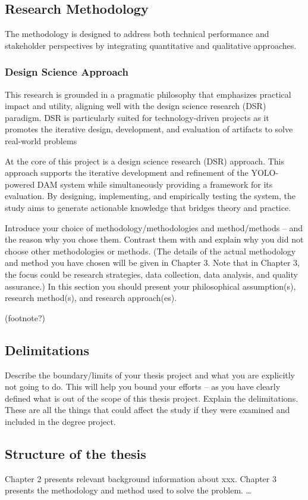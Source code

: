 \documentclass[a4paper,12pt,twocolumn]{article}
\numberwithin{figure}{section}
\numberwithin{table}{section}
\begin{document}
\subsection{Research Methodology}
The methodology is designed to address both technical 
performance and stakeholder perspectives by integrating 
quantitative and qualitative approaches.

\subsubsection{Design Science Approach}
This research is grounded in a pragmatic philosophy that 
emphasizes practical impact and utility, aligning well with 
the design science research (DSR) paradigm. DSR is particularly suited for technology-driven projects as it promotes the iterative design, development, and evaluation of artifacts to solve real-world problems

At the core of this project is a design science research (DSR) approach.
 This approach supports the iterative development and refinement of the
 YOLO-powered DAM system while simultaneously providing a framework 
 for its evaluation. By designing, implementing, and empirically testing 
 the system, the study aims to generate actionable knowledge that 
 bridges theory and practice.



Introduce your choice of methodology/methodologies and method/methods – and the reason why
you chose them. Contrast them with and explain why you did not choose other methodologies or
methods. (The details of the actual methodology and method you have chosen will be given in
Chapter 3. Note that in Chapter 3, the focus could be research strategies, data collection, data
analysis, and quality assurance.)
In this section you should present your philosophical assumption(s), research method(s), and
research approach(es).

(footnote?)
\subsection{Delimitations}
Describe the boundary/limits of your thesis project and what you are explicitly not going to do. This
will help you bound your efforts – as you have clearly defined what is out of the scope of this
thesis project. Explain the delimitations. These are all the things that could affect the study if they
were examined and included in the degree project.

\subsection{Structure of the thesis}
Chapter 2 presents relevant background information about xxx. Chapter 3 presents the
methodology and method used to solve the problem. …
\end{document}
